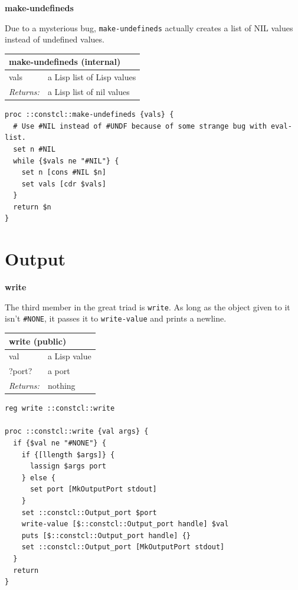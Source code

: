 \documentclass[twoside,9pt]{report}
\begin{document}
\textbf{make-undefineds}


Due to a mysterious bug, \texttt{make-undefineds} actually creates a list of NIL values instead of undefined values.

\begin{tabular}{ |l l| }
\hline
\multicolumn{2}{|l|}{make-undefineds (internal)} \\
\hline
vals & a Lisp list of Lisp values \\
\textit{Returns:} & a Lisp list of nil values \\
\hline
\end{tabular}

\noindent\makebox[\linewidth]{\rule{\linewidth}{0.4pt}}
\begin{lstlisting}
proc ::constcl::make-undefineds {vals} {
  # Use #NIL instead of #UNDF because of some strange bug with eval-list.
  set n #NIL
  while {$vals ne "#NIL"} {
    set n [cons #NIL $n]
    set vals [cdr $vals]
  }
  return $n
}
\end{lstlisting}
\noindent\makebox[\linewidth]{\rule{\linewidth}{0.4pt}}
\chapter{Output}
\label{output}

\textbf{write}


The third member in the great triad is \texttt{write}. As long as the object given to it isn't \texttt{\#NONE}, it passes it to \texttt{write-value} and prints a newline.

\begin{tabular}{ |l l| }
\hline
\multicolumn{2}{|l|}{write (public)} \\
\hline
val & a Lisp value \\
?port? & a port \\
\textit{Returns:} & nothing \\
\hline
\end{tabular}

\noindent\makebox[\linewidth]{\rule{\linewidth}{0.4pt}}
\begin{lstlisting}
reg write ::constcl::write
 
proc ::constcl::write {val args} {
  if {$val ne "#NONE"} {
    if {[llength $args]} {
      lassign $args port
    } else {
      set port [MkOutputPort stdout]
    }
    set ::constcl::Output_port $port
    write-value [$::constcl::Output_port handle] $val
    puts [$::constcl::Output_port handle] {}
    set ::constcl::Output_port [MkOutputPort stdout]
  }
  return
}
\end{lstlisting}
\noindent\makebox[\linewidth]{\rule{\linewidth}{0.4pt}}
\end{document}
